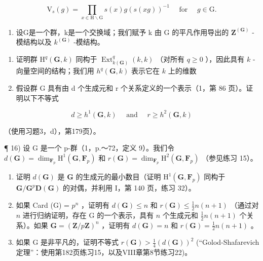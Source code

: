 \[
\mathrm{V} _ {s} (g) = \prod_ {x \in \mathrm{H} \backslash \mathrm{G}} s (x) g (s (x g)) ^ {- 1} \quad \text { for } \quad g \in \mathrm{G}.
\]

\begin{enumerate}
\def\labelenumi{\arabic{enumi})}
\setcounter{enumi}{14}
\tightlist
\item
  设G是一个群，k是一个交换域；我们赋予 k 由 G 的平凡作用导出的 \(\mathbf{Z}^{(\mathbf{G})}\) -模结构以及 \(k^{(\mathbf{G})}\) -模结构。
\end{enumerate}

\begin{enumerate}
\def\labelenumi{\alph{enumi})}
\item
  证明群 \(\mathrm{H}^q (\mathbf{G},k)\) 同构于 \(\operatorname {Ext}_{k(\mathbf{G})}^{q}(k,k)\) （对所有 \(q\geqslant 0\) ），因此具有 \(k\) -向量空间的结构；我们用 \(h^q (\mathbf{G},k)\) 表示它在 \(k\) 上的维数
\item
  假设群 G 具有由 d 个生成元和 r 个关系定义的一个表示（1，第 86 页）。证明以下不等式
\end{enumerate}

\[
d \geqslant h ^ {1} (\mathbf {G}, k) \quad \text { and } \quad r \geqslant h ^ {2} (\mathbf {G}, k)
\]

（使用习题3，d），第179页）。

¶ 16) 设 G 是一个 p-群（1，p.～72，定义 9）。我们令 \(d(\mathbf{G}) = \dim_{\mathbf{F}_{p}} \mathrm{H}^{1}(\mathbf{G}, \mathbf{F}_{p})\) 和 \(r(\mathbf{G}) = \dim_{\mathbf{F}_{p}} \mathrm{H}^{2}(\mathbf{G}, \mathbf{F}_{p})\) （参见练习 15）。

\begin{enumerate}
\def\labelenumi{\alph{enumi})}
\item
  证明 \(d(\mathbf{G})\) 是 \(\mathbf{G}\) 的生成元的最小数目（证明 \(\mathrm{H}^1 (\mathbf{G},\mathbf{F}_p)\) 同构于 \(\mathbf{G} / \mathbf{G}^p\mathbf{D}(\mathbf{G})\) 的对偶，并利用 I，第 140 页，练习 32）。
\item
  如果 Card (G) = \(p^n\) ，证明有 \(d(\mathbf{G}) \leqslant n\) 和 \(r(\mathbf{G}) \leqslant \frac{1}{2} n(n + 1)\) （通过对 \(n\) 进行归纳证明，存在 G 的一个表示，具有 \(n\) 个生成元和 \(\frac{1}{2} n(n + 1)\) 个关系）。如果 \(\mathbf{G} = (\mathbf{Z}/p\mathbf{Z})^n\) ，证明有 \(d(\mathbf{G}) = n\) 和 \(r(\mathbf{G}) = \frac{1}{2} n(n + 1)\) 。
\item
  如果 G 是非平凡的，证明不等式 \(r(\mathbf{G}) > \frac{1}{4}(d(\mathbf{G}))^{2}\) (“Golod-Shafarevich定理”：使用第182页练习15，以及VIII章第8节练习22)。
\end{enumerate}

